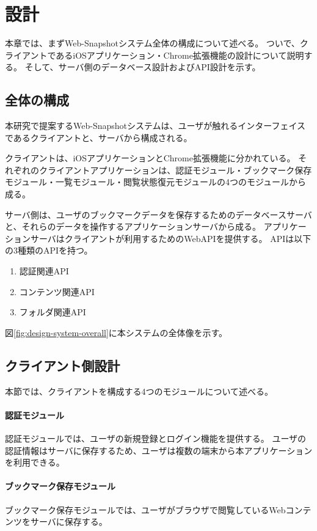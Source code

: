 \chapter{設計}
\label{chap:design}
本章では、まずWeb-Snapshotシステム全体の構成について述べる。
ついで、クライアントであるiOSアプリケーション・Chrome拡張機能の設計について説明する。
そして、サーバ側のデータベース設計およびAPI設計を示す。

\section{全体の構成}
本研究で提案するWeb-Snapshotシステムは、ユーザが触れるインターフェイスであるクライアントと、サーバから構成される。

クライアントは、iOSアプリケーションとChrome拡張機能に分かれている。
それぞれのクライアントアプリケーションは、認証モジュール・ブックマーク保存モジュール・一覧モジュール・閲覧状態復元モジュールの4つのモジュールから成る。

サーバ側は、ユーザのブックマークデータを保存するためのデータベースサーバと、それらのデータを操作するアプリケーションサーバから成る。
アプリケーションサーバはクライアントが利用するためのWebAPIを提供する。
APIは以下の3種類のAPIを持つ。
\begin{enumerate}
   \item 認証関連API
   \item コンテンツ関連API
   \item フォルダ関連API
\end{enumerate}

図\ref{fig:design-system-overall}に本システムの全体像を示す。

\section{クライアント側設計}
本節では、クライアントを構成する4つのモジュールについて述べる。

\subsubsection{認証モジュール}
認証モジュールでは、ユーザの新規登録とログイン機能を提供する。
ユーザの認証情報はサーバに保存するため、ユーザは複数の端末から本アプリケーションを利用できる。

\subsubsection{ブックマーク保存モジュール}
ブックマーク保存モジュールでは、ユーザがブラウザで閲覧しているWebコンテンツをサーバに保存する。

